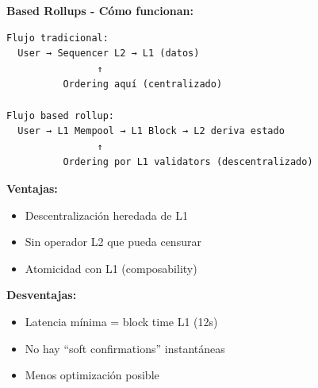 \documentclass[11pt,a4paper,twoside,openright]{book}
\theoremstyle{definition}
\theoremstyle{plain}
\theoremstyle{remark}
\begin{document}
\begin{mathnote}
\textbf{Based Rollups - Cómo funcionan:}

\begin{verbatim}
Flujo tradicional:
  User → Sequencer L2 → L1 (datos)
                ↑
          Ordering aquí (centralizado)

Flujo based rollup:
  User → L1 Mempool → L1 Block → L2 deriva estado
                ↑
          Ordering por L1 validators (descentralizado)
\end{verbatim}

\textbf{Ventajas:}
\begin{itemize}
    \item Descentralización heredada de L1
    \item Sin operador L2 que pueda censurar
    \item Atomicidad con L1 (composability)
\end{itemize}

\textbf{Desventajas:}
\begin{itemize}
    \item Latencia mínima = block time L1 (12s)
    \item No hay ``soft confirmations'' instantáneas
    \item Menos optimización posible
\end{itemize}
\end{mathnote}
\end{document}
